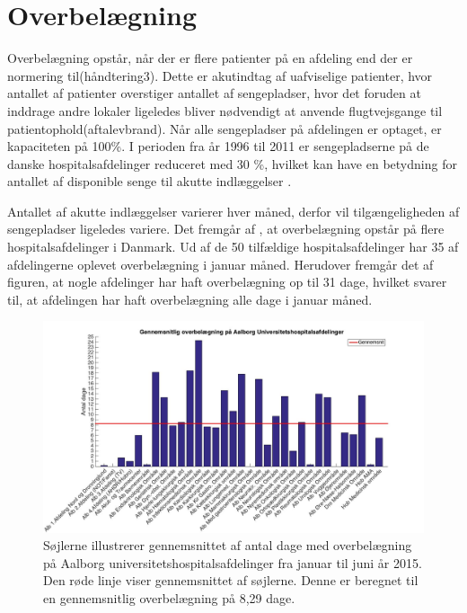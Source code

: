 \section{Overbelægning}\label{sec:overbelaegning}

Overbelægning opstår, når der er flere patienter på en afdeling end der er normering til(håndtering3). Dette er akutindtag af uafviselige patienter, hvor antallet af patienter overstiger antallet af sengepladser, hvor det foruden at inddrage andre lokaler ligeledes bliver nødvendigt at anvende flugtvejsgange til patientophold(aftalevbrand). Når alle sengepladser på afdelingen er optaget, er kapaciteten på 100\%. I perioden fra år 1996 til 2011 er sengepladserne på de danske hospitalsafdelinger reduceret med 30 \%, hvilket kan have en betydning for antallet af disponible senge til akutte indlæggelser \cite{Madsen2014}.

Antallet af akutte indlæggelser varierer hver måned, derfor vil tilgængeligheden af sengepladser ligeledes variere. Det fremgår af , at overbelægning opstår på flere hospitalsafdelinger i Danmark. Ud af de 50 tilfældige hospitalsafdelinger har 35 af afdelingerne oplevet overbelægning i januar måned. Herudover fremgår det af figuren, at nogle afdelinger har haft overbelægning op til 31 dage, hvilket svarer til, at afdelingen har haft overbelægning alle dage i januar måned. 


\begin{figure}[H]
\centering
\includegraphics[width=1\textwidth]{figures/overbelaegning_AUH}
\caption{Søjlerne illustrerer gennemsnittet af antal dage med overbelægning på Aalborg universitetshospitalsafdelinger fra januar til juni år 2015. \cite{SDS2015} Den røde linje viser gennemsnittet af søjlerne. Denne er beregnet til en gennemsnitlig overbelægning på 8,29 dage.}
\label{fig:overbelaegning_AUH}
\end{figure}

